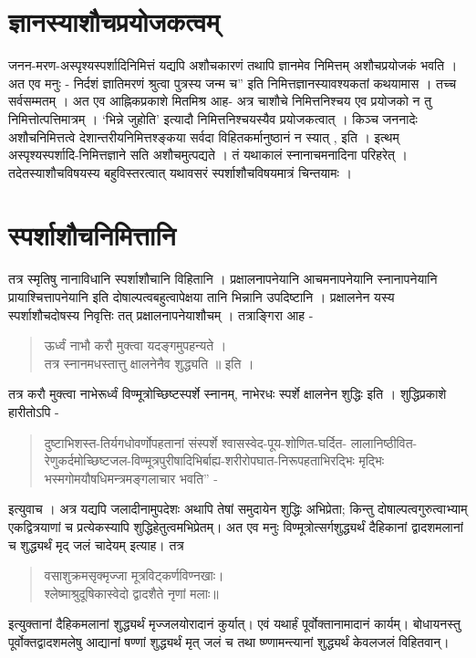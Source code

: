 {\section{ज्ञानस्याशौचप्रयोजकत्वम्}  

जनन-मरण-अस्पृश्यस्पर्शादिनिमित्तं यद्यपि अशौचकारणं तथापि ज्ञानमेव निमित्तम् अशौचप्रयोजकं भवति । अत एव मनुः - निर्दशं ज्ञातिमरणं श्रुत्वा पुत्रस्य जन्म च” इति निमित्तज्ञानस्यावश्यकतां कथयामास । तच्च सर्वसम्मतम् । अत एव आह्निकप्रकाशे मितमिश्र आह- अत्र चाशौचे निमित्तनिश्चय एव प्रयोजको न तु निमित्तोत्पत्तिमात्रम् । ‘भिन्ने जुहोति’ इत्यादौ निमित्तनिश्चयस्यैव प्रयोजकत्वात् । किञ्च जननादेः अशौचनिमित्तत्वे देशान्तरीयनिमित्तश्ङ्कया सर्वदा विहितकर्मानुष्ठानं न स्यात् , इति । इत्थम् अस्पृश्यस्पर्शादि-निमित्तज्ञाने सति अशौचमुत्पद्यते । तं यथाकालं स्नानाचमनादिना परिहरेत् । तदेतस्याशौचविषयस्य बहुविस्तरत्वात् यथावसरं स्पर्शाशौचविषयमात्रं चिन्तयामः ।

\section*{स्पर्शाशौचनिमित्तानि}

तत्र स्मृतिषु नानाविधानि स्पर्शाशौचानि विहितानि । प्रक्षालनापनेयानि आचमनापनेयानि स्नानापनेयानि प्रायाश्चित्तापनेयानि इति दोषाल्पत्वबहुत्वापेक्षया तानि भिन्नानि उपदिष्टानि । प्रक्षालनेन यस्य स्पर्शाशौचदोषस्य निवृत्तिः तत् प्रक्षालनापनेयाशौचम् । तत्राङ्गिरा आह -
\begin{verse}
ऊर्ध्वं नाभौ करौ मुक्त्वा यदङ्गमुपहन्यते ।\\
तत्र स्नानमधस्तात्तु क्षालनेनैव शुद्ध्यति ॥ इति । 
\end{verse}
तत्र करौ मुक्त्वा नाभेरूर्ध्वं विण्मूत्रोच्छिष्टस्पर्शे स्नानम्, नाभेरधः स्पर्शे क्षालनेन शुद्धिः इति । शुद्धिप्रकाशे हारीतोऽपि - 
\begin{quote}
दुष्टाभिशस्त-तिर्यगधोवर्णोपहतानां संस्पर्शे श्वासस्वेद-पूय-शोणित-घर्दित- लालानिष्ठीवित-रेणुकर्दमोच्छिष्टजल-विण्मूत्रपुरीषादिभिर्बाह्य-शरीरोपघात-निरूपहताभिरद्भिः मृद्भिः भस्मगोमयौषधिमन्त्रमङ्गलाचार भवति” -
\end{quote}
इत्युवाच । अत्र यद्यपि जलादीनामुपदेशः अथापि तेषां समुदायेन शुद्धिः अभिप्रेता; किन्तु दोषाल्पत्वगुरुत्वाभ्याम् एकद्वित्रयाणां च प्रत्येकस्यापि शुद्धिहेतुत्वमभिप्रेतम्। अत एव मनुः विण्मूत्रोत्सर्गशुद्ध्यर्थं दैहिकानां द्वादशमलानां च शुद्ध्यर्थं मृद् जलं चादेयम् इत्याह। तत्र 
\begin{verse}
वसाशुक्रमसृक्मृज्जा मूत्रविट्कर्णविण्नखाः। \\
श्लेष्माश्रुदूषिकास्वेदो द्वादशैते नृणां मलाः॥
\end{verse}
इत्युक्तानां दैहिकमलानां शुद्ध्यर्थं मृज्जलयोरादानं कुर्यात्। एवं यथार्हं पूर्वोक्तानामादानं कार्यम्। बोधायनस्तु पूर्वोक्तद्वादशमलेषु आद्यानां षण्णां शुद्ध्यर्थं मृत् जलं च तथा ष्ण्णामन्त्यानां शुद्ध्यर्थं केवलजलं विहितवान्।

}
